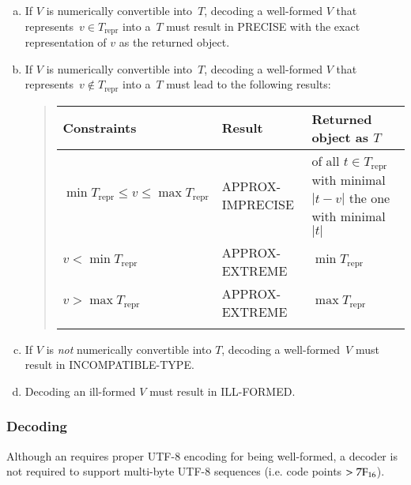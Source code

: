 \begin{enumerate}[a)]
    \item
    If $V$ is numerically convertible into~$T$,
    decoding a well-formed $V$ that represents~$v \in T_{\text{repr}}$ into a~$T$ must result in PRECISE with
    the exact representation of $v$ as the returned object.

    \item
    If $V$ is numerically convertible into~$T$,
    decoding a well-formed $V$ that represents~$v \notin T_{\text{repr}}$ into a~$T$ must lead to the following results:
    \begin{quote}
        \newcommand{\addextrarowsep}{\addlinespace[0.7ex]}%
        \noindent
        \begin{tabular}{v{0.25\textwidth} l v{0.25\textwidth}}
            \toprule
            Constraints & Result & Returned object as $T$ \\
            \midrule
            $\min{T_{\text{repr}}} \le v \le \max{T_{\text{repr}}}$ &
                APPROX-IMPRECISE &
                of all $t \in T_{\text{repr}}$ with minimal $|t - v|$ the one with minimal~$|t|$ \\ \addextrarowsep
            $v < \min{T_{\text{repr}}}$ &
                APPROX-EXTREME & $\min{T_{\text{repr}}}$ \\ \addextrarowsep
            $v > \max{T_{\text{repr}}}$ &
                APPROX-EXTREME & $\max{T_{\text{repr}}}$ \\ \addextrarowsep
            \bottomrule
        \end{tabular}
    \end{quote}

    \item
    If $V$ is \emph{not} numerically convertible into $T$, decoding a well-formed~$V$ must
    result in INCOMPATIBLE-TYPE.

    \item
    Decoding an ill-formed $V$ must result in ILL-FORMED.
\end{enumerate}


\subsubsection{Decoding \DborUtfEightStringValue}

Although an \DborUtfEightStringValue{} requires proper UTF-8 encoding for being well-formed,
a decoder is not required to support multi-byte UTF-8 sequences (i.e. code points $> \mathrm{7F}_{16}$).

